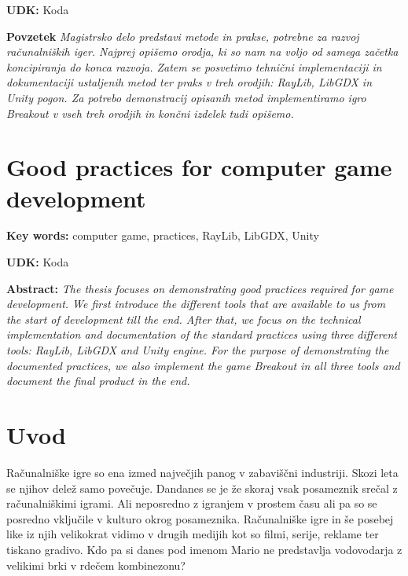 \documentclass[12pt,a4paper,twoside]{book}
\begin{document}
\textbf{UDK:} Koda

\textbf{Povzetek}\newline
\textit{Magistrsko delo predstavi metode in prakse, potrebne za razvoj računalniških iger. Najprej opišemo orodja, ki so nam na voljo od samega začetka koncipiranja do konca razvoja. Zatem se posvetimo tehnični implementaciji in dokumentaciji ustaljenih metod ter praks v treh orodjih: RayLib, LibGDX in Unity pogon. Za potrebo demonstracij opisanih metod implementiramo igro Breakout v vseh treh orodjih in končni izdelek tudi opišemo.}
\cleardoublepage

\chapter*{Good practices for computer game development}\thispagestyle{fancy}
\textbf{Key words:} computer game, practices, RayLib, LibGDX, Unity

\textbf{UDK:} Koda

\textbf{Abstract:}\newline
\textit{The thesis focuses on demonstrating good practices required for game development. We first introduce the different tools that are available to us from the start of development till the end. After that, we focus on the technical implementation and documentation of the standard practices using three different tools: RayLib, LibGDX and Unity engine. For the purpose of demonstrating the documented practices, we also implement the game Breakout in all three tools and document the final product in the end.}
\cleardoublepage

\tableofcontents

\listoffigures

\lstlistoflistings

\chapter{Uvod}\thispagestyle{fancy}
\setcounter{page}{1}

Računalniške igre so ena izmed največjih panog v zabaviščni industriji. Skozi leta se njihov delež samo povečuje. Dandanes se je že skoraj vsak posameznik srečal z računalniškimi igrami. Ali neposredno z igranjem v prostem času ali pa so se posredno vključile v kulturo okrog posameznika. Računalniške igre in še posebej like iz njih velikokrat vidimo v drugih medijih kot so filmi, serije, reklame ter tiskano gradivo. Kdo pa si danes pod imenom Mario ne predstavlja vodovodarja z velikimi brki v rdečem kombinezonu?
\end{document}
